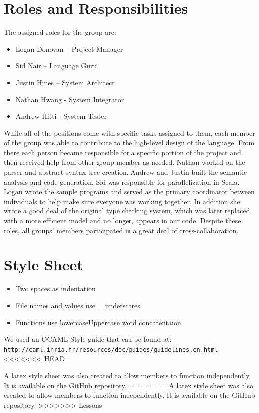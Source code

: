 \section{Roles and Responsibilities}
The assigned roles for the group are:
\begin{itemize}
\item Logan Donovan – Project Manager
\item Sid Nair – Language Guru
\item Justin Hines – System Architect
\item Nathan Hwang - System Integrator
\item Andrew Hitti	- System Tester
\end{itemize}

While all of the positions come with specific tasks assigned to them,
each member of the group was able to contribute to the high-level
design of the language.  From there each person became responsible for
a specific portion of the project and then received help from other
group member as needed. Nathan worked on the parser and abstract
syntax tree creation. Andrew and Justin built the semantic analysis
and code generation. Sid was responsible for parallelization in
Scala. Logan wrote the sample programs and served as the primary
coordinator between individuals to help make sure everyone was working
together. In addition she wrote a good deal of the original type
checking system, which was later replaced with a more efficient model
and no longer, appears in our code. Despite these roles, all groups'
members participated in a great deal of cross-collaboration.

\section{Style Sheet}
\begin{itemize}
\item Two spaces as indentation 
\item File names and values use \_ underscores
\item Functions use lowercaseUppercase word concatentaion 
\end{itemize}

We used an OCAML Style guide that can be found at:
\\ \verb=http://caml.inria.fr/resources/doc/guides/guidelines.en.html=
<<<<<<< HEAD

A latex style sheet was also created to allow members to function
independently. It is available on the GitHub repository.
=======
\newline
A latex style sheet was also created to allow members to function independently. It is available on the GitHub repository.
>>>>>>> Lessons
